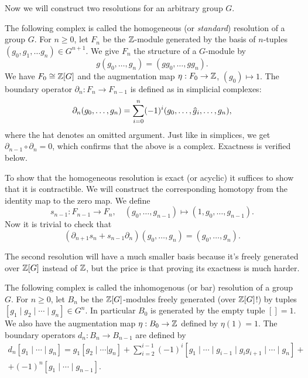 Now we will construct two resolutions for an arbitrary group $G$. 

\begin{defn}
    The following complex is called the homogeneous (or \emph{standard}) resolution of a group $G$. For $n\geq 0$, let $F_n$ be the $\mathbb{Z}$-module generated by the basis of $n$-tuples $(g_0,g_1,\ldots g_n)\in G^{n+1}$. We give $F_n$ the structure of a $G$-module by
    \[g(g_0,\ldots,g_n)=(gg_0,\ldots,gg_n).\]
    We have $F_0\cong \mathbb{Z}[G]$ and the augmentation map $\eta:F_0\to \mathbb{Z}$, $(g_0)\mapsto 1$. The boundary operator $\partial_n:F_n\to F_{n-1}$ is defined as in simplicial complexes:
    \[\partial_n(g_0,\ldots,g_n)=\sum_{i=0}^n(-1)^i(g_0,\ldots,\wh{g}_i,\ldots,g_n),\]
    where the hat denotes an omitted argument. Just like in simplices, we get $\partial_{n-1}\circ \partial_n=0$, which confirms that the above is a complex. Exactness is verified below.
\end{defn}

To show that the homogeneous resolution is exact (or acyclic) it suffices to show that it is contractible. We will construct the corresponding homotopy from the identity map to the zero map. We define
\[s_{n-1}:F_{n-1}\to F_n,\quad (g_0,\ldots,g_{n-1})\mapsto (1,g_0,\ldots,g_{n-1}).\]
Now it is trivial to check that
\[(\partial_{n+1}s_n+s_{n-1}\partial_n)(g_0,\ldots,g_n)=(g_0,\ldots,g_n).\]


The second resolution will have a much smaller basis because it's freely generated over $\mathbb{Z}[G]$ instead of $\mathbb{Z}$, but the price is that proving its exactness is much harder.
\begin{defn}
    The following complex is called the inhomogenous (or bar) resolution of a group $G$. For $n\geq 0$, let $B_n$ be the $\mathbb{Z}[G]$-modules freely generated (over $\mathbb{Z}[G]$!) by tuples $[g_1\mid g_2\mid\cdots \mid g_n]\in G^n$. In particular $B_0$ is generated by the empty tuple $[]=1$. We also have the augmentation map $\eta:B_0\to\mathbb{Z}$ defined by $\eta(1)=1$. The boundary operators $d_n:B_n\to B_{n-1}$ are defined by
    \begin{multline}
        d_n[g_1\mid\cdots\mid g_n]=g_1[g_2\mid\cdots|g_n]+\sum_{i=2}^{i-1}(-1)^i[g_1\mid\cdots\mid g_{i-1}\mid g_ig_{i+1}\mid\cdots\mid g_n]+\\+(-1)^n[g_1\mid\cdots\mid g_{n-1}].
    \end{multline}
\end{defn}

